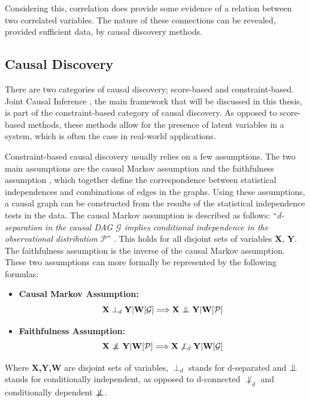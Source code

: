 \documentclass[a4paper,pdf]{article}
\newcommand{\CI}{\mathrel{\perp\mspace{-10mu}\perp}}
\newcommand{\nCI}{\centernot{\CI}}
\newcommand{\dsep}{\perp_d}
\newcommand{\dcon}{\not \perp_d}
\newcommand{\Sara}[1]{{\color{blue} Sara: #1}}
\begin{document}
Considering this, correlation does provide some evidence of a relation between two correlated variables. The nature of these connections can be revealed, provided sufficient data, by causal discovery methods.

\subsection{Causal Discovery}
There are two categories of causal discovery; score-based and constraint-based. Joint Causal Inference \cite{jci}, the main framework that will be discussed in this thesis, is part of the constraint-based category of causal discovery. As opposed to score-based methods, these methods allow for the presence of latent variables in a system, which is often the case in real-world applications.

Constraint-based causal discovery usually relies on a few assumptions. The two main assumptions are the causal Markov assumption and the faithfulness assumption \cite{fci,jci}, which together define the correspondence between statistical independences and combinations of edges in the graphs. Using these assumptions, a causal graph can be constructed from the results of the statistical independence tests in the data. The causal Markov assumption is described as follows: ``\textit{d-separation in the causal DAG $\mathcal{G}$ implies conditional independence in the observational distribution $\mathcal{P}$}'' \cite[p.~3]{jci}. This holds for all disjoint sets of variables \textbf{X}, \textbf{Y}. The faithfulness assumption is the inverse of the causal Markov assumption. These two assumptions can more formally be represented by the following formulas:
\begin{itemize}
    \item \textbf{Causal Markov Assumption:} $$\textbf{X} \dsep \textbf{Y} | \textbf{W}[\mathcal{G}] \Longrightarrow \textbf{X} \CI \textbf{Y} | \textbf{W}[\mathcal{P}]$$
    \item \textbf{Faithfulness Assumption:} $$\textbf{X} \nCI \textbf{Y} | \textbf{W}[\mathcal{P}] \Longrightarrow \textbf{X} \dcon \textbf{Y} | \textbf{W}[\mathcal{G}] $$
\end{itemize}
Where \textbf{X,Y,W} are disjoint sets of variables, $\dsep$ stands for d-separated and $\CI$ stands for conditionally independent, as opposed to d-connected $\dcon$ and conditionally dependent $\nCI$. 
\end{document}
